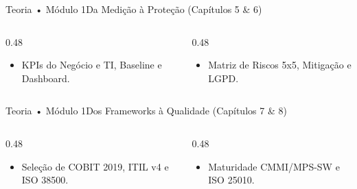 \begin{senaiframe}{Teoria • Módulo 1}{Da Medição à Proteção (Capítulos 5 \& 6)}
  \begin{columns}[t]
    \begin{column}{0.48\textwidth}
      \begin{tcolorbox}[senaigreencard, title={Capítulo 5: Como Medimos}]
        \begin{itemize}
          \item KPIs do Negócio e TI, Baseline e Dashboard.
        \end{itemize}
      \end{tcolorbox}
    \end{column}
    \begin{column}{0.48\textwidth}
      \begin{tcolorbox}[senairedcard, title={Capítulo 6: Como nos Protegemos}]
        \begin{itemize}
          \item Matriz de Riscos 5x5, Mitigação e LGPD.
        \end{itemize}
      \end{tcolorbox}
    \end{column}
  \end{columns}
\end{senaiframe}

\begin{senaiframe}{Teoria • Módulo 1}{Dos Frameworks à Qualidade (Capítulos 7 \& 8)}
  \begin{columns}[t]
    \begin{column}{0.48\textwidth}
      \begin{tcolorbox}[senaibluecard, title={Capítulo 7: Melhores Práticas}]
        \begin{itemize}
          \item Seleção de COBIT 2019, ITIL v4 e ISO 38500.
        \end{itemize}
      \end{tcolorbox}
    \end{column}
    \begin{column}{0.48\textwidth}
      \begin{tcolorbox}[senaiambercard, title={Capítulo 8: Qualidade de Dev}]
        \begin{itemize}
          \item Maturidade CMMI/MPS-SW e ISO 25010.
        \end{itemize}
      \end{tcolorbox}
    \end{column}
  \end{columns}
\end{senaiframe}

